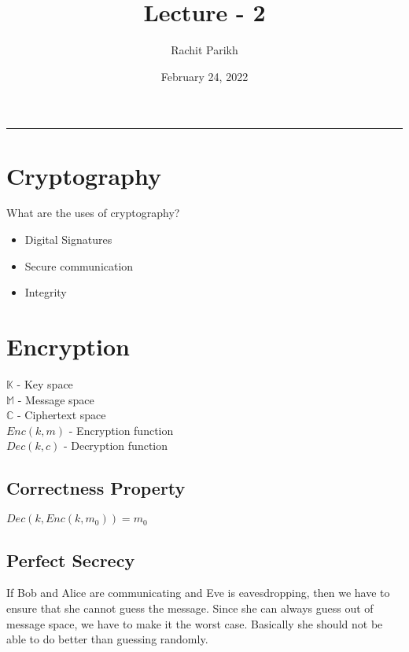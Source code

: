 \documentclass[14pt]{article}
\begin{document}
	\title{\Huge \textbf{Lecture - 2}} 
	\author{Rachit Parikh}
	\date{February 24, 2022}
	\maketitle
	
	\noindent
	\rule{\linewidth}{0.4pt}
	
	\section{Cryptography}
		\noindent
		\linebreak
		What are the uses of cryptography?
		\begin{itemize}
			\item Digital Signatures
			\item Secure communication
			\item Integrity
		\end{itemize}
	
	\section{Encryption}
		\noindent
		\linebreak
		$\mathbb{K}$ - Key space\\
		$\mathbb{M}$ - Message space\\
		$\mathbb{C}$ - Ciphertext space\\
		$Enc(k, m)$ - Encryption function\\
		$Dec(k, c)$ - Decryption function\\
		
		\subsection{Correctness Property}
			\noindent
			$Dec(k, Enc(k, m_0)) = m_0$
			
		
		\subsection{Perfect Secrecy}
			\noindent
			If Bob and Alice are communicating and Eve is eavesdropping, then we have to ensure that she cannot guess the message. Since she can always guess out of message space, we have to make it the worst case. Basically she should not be able to do better than guessing randomly.\\
			
\end{document}
